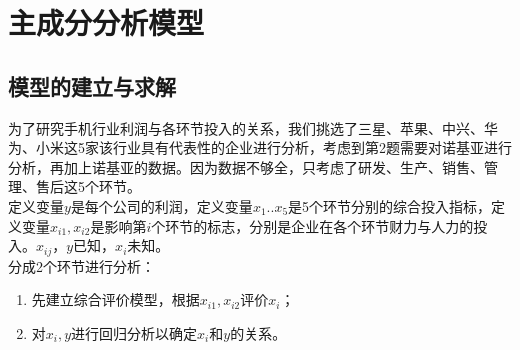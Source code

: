 \documentclass{article}
\begin{document}
\fi
\clearpage
\section{主成分分析模型}
\subsection{模型的建立与求解}
为了研究手机行业利润与各环节投入的关系，我们挑选了三星、苹果、中兴、华为、小米这5家该行业具有代表性的企业进行分析，考虑到第2题需要对诺基亚进行分析，再加上诺基亚的数据。因为数据不够全，只考虑了研发、生产、销售、管理、售后这5个环节。
\\\indent 定义变量\(y\)是每个公司的利润，定义变量\(x_1..x_5\)是5个环节分别的综合投入指标，定义变量\(x_{i1},x_{i2}\)是影响第\(i\)个环节的标志，分别是企业在各个环节财力与人力的投入。\(x_{ij}，y\)已知，\(x_i\)未知。
\\\indent 分成2个环节进行分析：
\begin{enumerate}
\item 先建立综合评价模型，根据\(x_{i1},x_{i2}\)评价\(x_i\)；
\item 对\(x_i,y\)进行回归分析以确定\(x_i\)和\(y\)的关系。
\end{enumerate}
\end{document}
